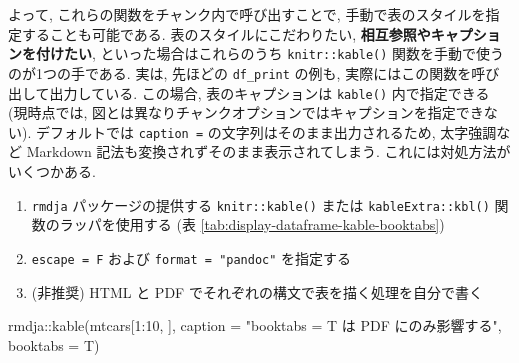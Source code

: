 \documentclass[
]{bxjsbook}
\newenvironment{Shaded}{\begin{snugshade}}{\end{snugshade}}
\newcommand{\AttributeTok}[1]{\textcolor[rgb]{0.77,0.63,0.00}{#1}}
\newcommand{\DecValTok}[1]{\textcolor[rgb]{0.00,0.00,0.81}{#1}}
\newcommand{\FunctionTok}[1]{\textcolor[rgb]{0.00,0.00,0.00}{#1}}
\newcommand{\NormalTok}[1]{#1}
\newcommand{\SpecialCharTok}[1]{\textcolor[rgb]{0.00,0.00,0.00}{#1}}
\newcommand{\StringTok}[1]{\textcolor[rgb]{0.31,0.60,0.02}{#1}}
\providecommand{\tightlist}{%
  \setlength{\itemsep}{0pt}\setlength{\parskip}{0pt}}
\theoremstyle{definition}
\theoremstyle{definition}
\theoremstyle{definition}
\theoremstyle{remark}
\begin{document}
よって, これらの関数をチャンク内で呼び出すことで,
手動で表のスタイルを指定することも可能である.
表のスタイルにこだわりたい, \textbf{相互参照やキャプションを付けたい},
といった場合はこれらのうち \texttt{knitr::kable()}
関数を手動で使うのが1つの手である. 実は, 先ほどの \texttt{df\_print}
の例も, 実際にはこの関数を呼び出して出力している. この場合,
表のキャプションは \texttt{kable()} 内で指定できる (現時点では,
図とは異なりチャンクオプションではキャプションを指定できない).
デフォルトでは \texttt{caption\ =} の文字列はそのまま出力されるため,
太字強調など Markdown 記法も変換されずそのまま表示されてしまう.
これには対処方法がいくつかある.

\begin{enumerate}
\def\labelenumi{\arabic{enumi}.}
\tightlist
\item
  \texttt{rmdja} パッケージの提供する \texttt{knitr::kable()} または
  \texttt{kableExtra::kbl()} 関数のラッパを使用する (表
  \ref{tab:display-dataframe-kable-booktabs})
\item
  \texttt{escape\ =\ F} および \texttt{format\ =\ "pandoc"} を指定する
\item
  (非推奨) HTML と PDF でそれぞれの構文で表を描く処理を自分で書く
\end{enumerate}

\begin{Shaded}
\begin{Highlighting}[numbers=left,,]
\NormalTok{rmdja}\SpecialCharTok{::}\FunctionTok{kable}\NormalTok{(mtcars[}\DecValTok{1}\SpecialCharTok{:}\DecValTok{10}\NormalTok{, ], }\AttributeTok{caption =} \StringTok{"\textasciigrave{}booktabs = T\textasciigrave{} は PDF にのみ影響する"}\NormalTok{, }\AttributeTok{booktabs =}\NormalTok{ T)}
\end{Highlighting}
\end{Shaded}
\end{document}

